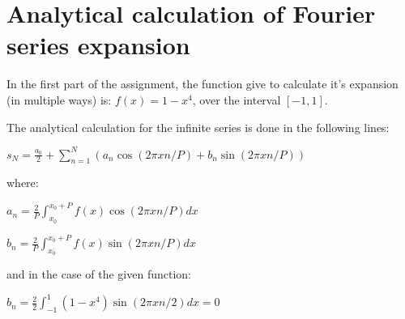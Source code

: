 \documentclass[paper=a4, fontsize=11pt]{scrartcl} %
\numberwithin{equation}{section} %
\numberwithin{figure}{section} %
\numberwithin{table}{section} %
\begin{document}
\begin{comment}

USEFUL LINKS:

official sources for terminology:
-----
http://www.intel.com/content/www/us/en/support/topics/glossary.html
https://www-01.ibm.com/software/globalization/terminology/a.html
-----




about IMB processors:
-----

insert in google: list of ibm processors
https://en.wikipedia.org/wiki/List_of_IBM_products
https://www-01.ibm.com/software/passportadvantage/guide_to_identifying_processor_family.html
http://www.nextplatform.com/2015/08/10/ibm-roadmap-extends-power-chips-to-2020-and-beyond/
http://www.theverge.com/2015/7/9/8919091/ibm-7nm-transistor-processor
https://www.ibm.com/developerworks/ibmi/library/i-ibmi-7_2-and-ibm-power8/
-----

\end{comment}

\section{Analytical calculation of Fourier series expansion}

In the first part of the assignment, the function give to calculate it's expansion (in multiple ways) is: $f(x) = 1-x^{4}$, over the interval $[-1, 1]$.

The analytical calculation for the infinite series is done in the following lines:

\begin{center}
$s_{N} = \frac{a_{0}}{2}+\sum_{n=1}^{N}\left( a_{n}\cos(2\pi x n /P)+b_{n}\sin(2\pi x n /P) \right)$
\end{center}

where:

\begin{center}
$a_{n} = \frac{2}{P}\int_{x_{0}}^{x_{0}+P}f(x)\cos(2\pi x n /P)dx$
\end{center}

\begin{center}
$b_{n} = \frac{2}{P}\int_{x_{0}}^{x_{0}+P}f(x)\sin(2\pi x n /P)dx$
\end{center}



and in the case of the given function:


\begin{center}
$b_{n} = \frac{2}{2}\int_{-1}^{1}(1-x^{4})\sin(2\pi x n /2)dx = 0$
\end{center}
\end{document}
